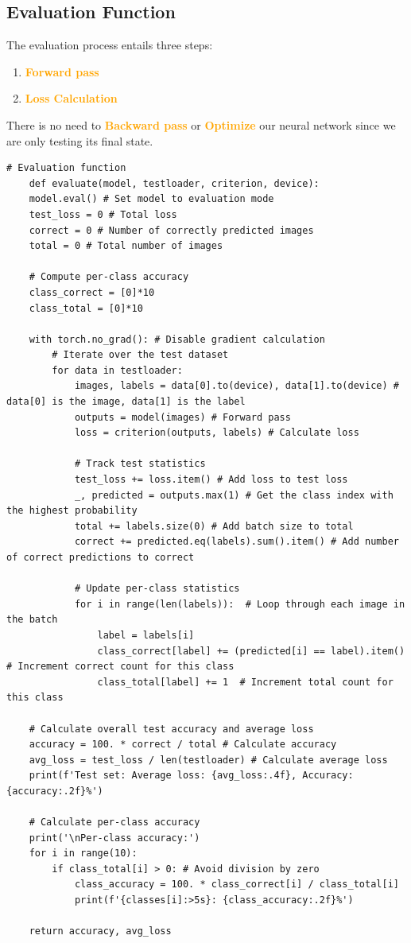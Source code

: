 \subsection{Evaluation Function}
The evaluation process entails three steps:
\begin{enumerate}
    \item \textcolor{orange}{\textbf{Forward pass}}
    \item \textcolor{orange}{\textbf{Loss Calculation}}
\end{enumerate}

There is no need to \textcolor{orange}{\textbf{Backward pass}} or \textcolor{orange}{\textbf{Optimize}}
our neural network since we are only testing its final state.

\begin{lstlisting}[caption={Evaluation Function}, label={lst:evaluation}]
    # Evaluation function
    def evaluate(model, testloader, criterion, device):
    model.eval() # Set model to evaluation mode
    test_loss = 0 # Total loss
    correct = 0 # Number of correctly predicted images
    total = 0 # Total number of images
    
    # Compute per-class accuracy
    class_correct = [0]*10
    class_total = [0]*10

    with torch.no_grad(): # Disable gradient calculation
        # Iterate over the test dataset
        for data in testloader: 
            images, labels = data[0].to(device), data[1].to(device) # data[0] is the image, data[1] is the label
            outputs = model(images) # Forward pass
            loss = criterion(outputs, labels) # Calculate loss
            
            # Track test statistics
            test_loss += loss.item() # Add loss to test loss
            _, predicted = outputs.max(1) # Get the class index with the highest probability
            total += labels.size(0) # Add batch size to total
            correct += predicted.eq(labels).sum().item() # Add number of correct predictions to correct

            # Update per-class statistics
            for i in range(len(labels)):  # Loop through each image in the batch
                label = labels[i]
                class_correct[label] += (predicted[i] == label).item()  # Increment correct count for this class
                class_total[label] += 1  # Increment total count for this class

    # Calculate overall test accuracy and average loss            
    accuracy = 100. * correct / total # Calculate accuracy
    avg_loss = test_loss / len(testloader) # Calculate average loss
    print(f'Test set: Average loss: {avg_loss:.4f}, Accuracy: {accuracy:.2f}%')

    # Calculate per-class accuracy
    print('\nPer-class accuracy:')
    for i in range(10):
        if class_total[i] > 0: # Avoid division by zero
            class_accuracy = 100. * class_correct[i] / class_total[i]
            print(f'{classes[i]:>5s}: {class_accuracy:.2f}%')

    return accuracy, avg_loss
\end{lstlisting}


